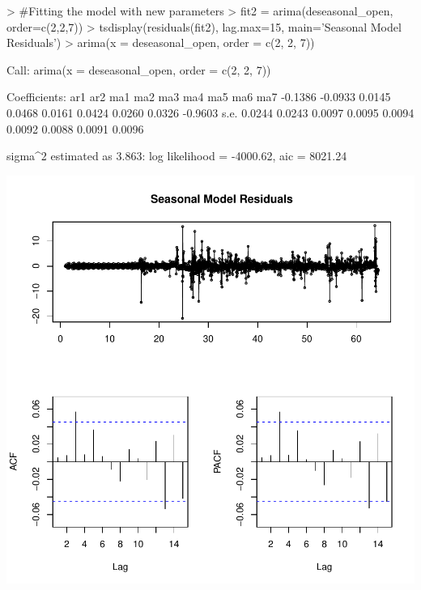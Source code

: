 \documentclass{article}
\begin{document}
\begin{Schunk}
\begin{Sinput}
> #Fitting the model with new parameters
> fit2 = arima(deseasonal_open, order=c(2,2,7))
> tsdisplay(residuals(fit2), lag.max=15, main='Seasonal Model Residuals')
> arima(x = deseasonal_open, order = c(2, 2, 7))
\end{Sinput}
\begin{Soutput}
Call:
arima(x = deseasonal_open, order = c(2, 2, 7))

Coefficients:
          ar1      ar2     ma1     ma2     ma3     ma4     ma5     ma6      ma7
      -0.1386  -0.0933  0.0145  0.0468  0.0161  0.0424  0.0260  0.0326  -0.9603
s.e.   0.0244   0.0243  0.0097  0.0095  0.0094  0.0092  0.0088  0.0091   0.0096

sigma^2 estimated as 3.863:  log likelihood = -4000.62,  aic = 8021.24
\end{Soutput}
\end{Schunk}
\includegraphics{Report-018}
\end{document}

